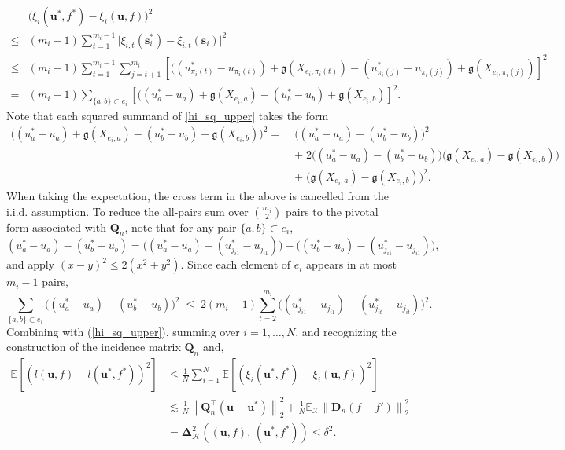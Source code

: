 \documentclass[
  12pt]{article}
\begin{document}
\begin{align}
&\bigl(\xi_i(\boldsymbol{u}^*,f^*)-\xi_i(\boldsymbol{u},f)\bigr)^2\nonumber\\
\leq&
  (m_i-1)\sum_{t=1}^{m_i-1}
  \bigl|\xi_{i,t}(\boldsymbol{s}_i^*)-\xi_{i,t}(\boldsymbol{s}_i)
  \bigr|^2 \nonumber\\
\leq&
  (m_i-1)\sum_{t=1}^{m_i-1}\sum_{j=t+1}^{m_i}
  \left[((u_{\pi_i(t)}^*-u_{\pi_i(t)})+\mathfrak{g}(X_{e_i,\pi_i(t)})-(u_{\pi_i(j)}^*-u_{\pi_i(j)})+\mathfrak{g}(X_{e_i,{\pi_i(j)}})\right]^2 \nonumber \\
=&
  (m_i-1)\!\!\sum_{\{a,b\}\subset e_i}\!\!
  \left[((u_{a}^*-u_{a})+\mathfrak{g}(X_{e_i,a})-(u_{b}^*-u_{b})+\mathfrak{g}(X_{e_i,{b}})\right]^2.\label{hi_sq_upper}
\end{align}
\noindent Note that each squared summand of \eqref{hi_sq_upper} takes the form 
$$\begin{aligned}
\bigl((u_{a}^*-u_{a})+\mathfrak{g}(X_{e_i,a})-(u_{b}^*-u_{b})+\mathfrak{g}(X_{e_i,{b}})\bigr)^2
=\;&\bigl((u_a^*\!-u_a)-(u_b^*\!-u_b)\bigr)^2\\
&+\;2\bigl((u_a^*\!-u_a)-(u_b^*\!-u_b)\bigr)
     \bigl(\mathfrak{g}(X_{e_i,a})-\mathfrak{g}(X_{e_i,b})\bigr)\\
&+\;\bigl(\mathfrak{g}(X_{e_i,a})-\mathfrak{g}(X_{e_i,b})\bigr)^2.
\end{aligned}$$
\noindent When taking the expectation, the cross term in the above is cancelled from the i.i.d. assumption. To reduce the all-pairs sum over $\binom{m_i}{2}$ pairs to the
pivotal form associated with $\boldsymbol{Q}_n$, note that for any
pair $\{a,b\}\subset e_i$,
$$(u_a^*\!-u_a)-(u_b^*\!-u_b)
=\bigl((u_a^*\!-u_a)-(u_{j_{i1}}^*\!-u_{j_{i1}})\bigr)
 -\bigl((u_b^*\!-u_b)-(u_{j_{i1}}^*\!-u_{j_{i1}})\bigr),$$
and apply $(x-y)^2\leq 2(x^2+y^2)$. Since each element of $e_i$ appears in at most $m_i-1$ pairs,
$$\sum_{\{a,b\}\subset e_i}
  \!\bigl((u_a^*\!-u_a)-(u_b^*\!-u_b)\bigr)^2
\;\leq\;
2(m_i-1)\sum_{t=2}^{m_i}
  \bigl((u_{j_{i1}}^*\!-u_{j_{i1}})
       -(u_{j_{it}}^*\!-u_{j_{it}})\bigr)^2.$$
\noindent Combining with (\ref{hi_sq_upper}), summing over
$i=1,\ldots,N$, and recognizing the construction of the incidence
matrix $\boldsymbol{Q}_n$ and,
$$\begin{aligned}
\mathbb{E}[(l(\boldsymbol{u},f)-l(\boldsymbol{u}^*,f^*))^2]&\leq\frac{1}{N}\sum_{i=1}^N\mathbb{E}[(\xi_i(\boldsymbol{u}^*,f^*)-\xi_i(\boldsymbol{u},f))^2]\\
&\lesssim 
  \frac{1}{N} \left\|\boldsymbol{Q}_n^{\top} \left(\boldsymbol{u}-\boldsymbol{u}^*\right)\right\|_2^2 +\frac{1}{N} \mathbb{E}_{\mathcal{X}}\left\|\boldsymbol{D}_n\left(f-f'\right)\right\|_2^2\\
&= \mathbf{\Delta}_{\mathcal{H}}^2
  \!\left((\boldsymbol{u},f),\,
         (\boldsymbol{u}^*,f^*)\right) \leq \delta^2.
\end{aligned}$$
\end{document}
